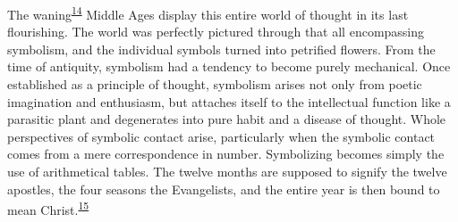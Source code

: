 The
waning\textsuperscript{\protect\hypertarget{16_Chapter_Nine__THE_DECLINE_OF_SYM.xhtmlux5cux23id_765}{\protect\hyperlink{23_NOTES.xhtmlux5cux23id_766}{14}}}
Middle Ages display this entire world of thought in its last
flourishing. The world was perfectly pictured through that all
encompassing symbolism, and the individual symbols turned into petrified
flowers. From the time of antiquity, symbolism had a tendency to become
purely mechanical. Once established as a principle of thought, symbolism
arises not only from poetic imagination and enthusiasm, but attaches
itself to the intellectual function like a parasitic plant and
degenerates into pure habit and a disease of thought. Whole perspectives
of symbolic contact arise, particularly when the symbolic contact comes
from a mere correspondence in number. Symbolizing becomes simply the use
of arithmetical tables. The twelve months are supposed to signify the
twelve apostles, the four seasons the Evangelists, and the entire year
is then bound to mean
Christ.\textsuperscript{\protect\hypertarget{16_Chapter_Nine__THE_DECLINE_OF_SYM.xhtmlux5cux23id_763}{\protect\hyperlink{23_NOTES.xhtmlux5cux23id_764}{15}}}

